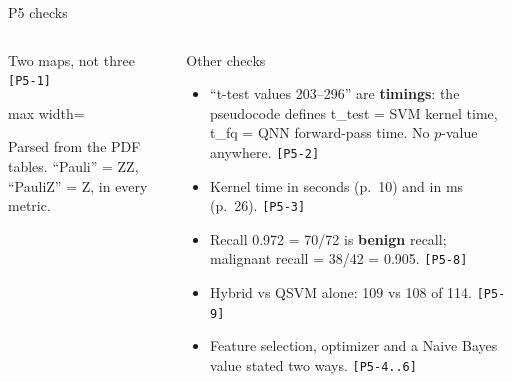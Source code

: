 \documentclass[aspectratio=169,10pt,t,xcolor={table}]{beamer}
\newcommand{\tabdir}{../reimplementation/tex/papers/}
\begin{document}
\begin{frame}{P5 checks}
\begin{columns}[T]
\begin{alertblock}{Two maps, not three \texttt{[P5-1]}}
\scriptsize
\begin{adjustbox}{max width=\linewidth}

\end{adjustbox}
\par\smallskip\footnotesize
Parsed from the PDF tables. ``Pauli'' = ZZ, ``PauliZ'' = Z, in every metric.
\end{alertblock}
\begin{alertblock}{Other checks}
\footnotesize
\begin{itemize}
  \item ``t-test values 203--296'' are \textbf{timings}: the pseudocode defines t\_test = SVM kernel time, t\_fq = QNN forward-pass time. No $p$-value anywhere. \texttt{[P5-2]}
  \item Kernel time in seconds (p.~10) and in ms (p.~26). \texttt{[P5-3]}
  \item Recall 0.972 = 70/72 is \textbf{benign} recall; malignant recall = 38/42 = 0.905. \texttt{[P5-8]}
  \item Hybrid vs QSVM alone: 109 vs 108 of 114. \texttt{[P5-9]}
  \item Feature selection, optimizer and a Naive Bayes value stated two ways. \texttt{[P5-4..6]}
\end{itemize}
\end{alertblock}
\end{columns}
\end{frame}
\end{document}
